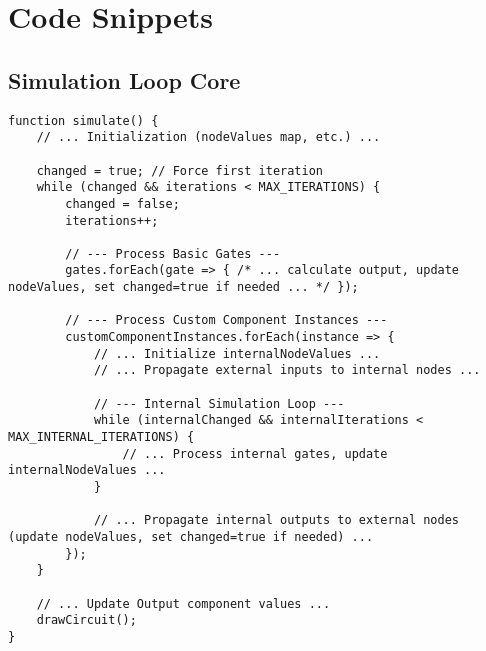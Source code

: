 \documentclass[11pt, a4paper]{article}
\begin{document}
\appendix
\section{Code Snippets}

\subsection{Simulation Loop Core}
\begin{lstlisting}[caption={Core structure of the main simulation loop}, label={lst:simulate}]
function simulate() {
    // ... Initialization (nodeValues map, etc.) ...

    changed = true; // Force first iteration
    while (changed && iterations < MAX_ITERATIONS) {
        changed = false; 
        iterations++;

        // --- Process Basic Gates ---
        gates.forEach(gate => { /* ... calculate output, update nodeValues, set changed=true if needed ... */ });

        // --- Process Custom Component Instances ---
        customComponentInstances.forEach(instance => {
            // ... Initialize internalNodeValues ...
            // ... Propagate external inputs to internal nodes ...

            // --- Internal Simulation Loop ---
            while (internalChanged && internalIterations < MAX_INTERNAL_ITERATIONS) {
                // ... Process internal gates, update internalNodeValues ... 
            }

            // ... Propagate internal outputs to external nodes (update nodeValues, set changed=true if needed) ...
        });
    }

    // ... Update Output component values ...
    drawCircuit();
}
\end{lstlisting}
\end{document}
